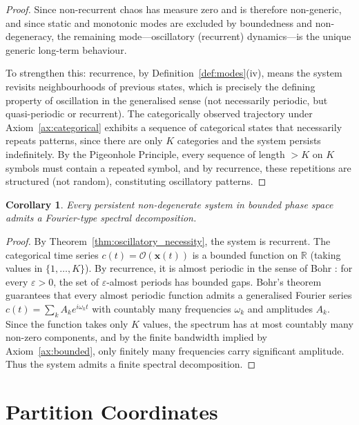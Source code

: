 \documentclass[11pt,twocolumn,a4paper]{article}
\newtheorem{corollary}[theorem]{Corollary}
\newcommand{\R}{\mathbb{R}}
\begin{document}
\begin{proof}
Since non-recurrent chaos has measure zero and is therefore
non-generic, and since static and monotonic modes are excluded by
boundedness and non-degeneracy, the remaining mode---oscillatory
(recurrent) dynamics---is the unique generic long-term behaviour.

To strengthen this: recurrence, by Definition~\ref{def:modes}(iv),
means the system revisits neighbourhoods of previous states, which is
precisely the defining property of oscillation in the generalised sense
(not necessarily periodic, but quasi-periodic or recurrent). The
categorically observed trajectory under Axiom~\ref{ax:categorical}
exhibits a sequence of categorical states that necessarily repeats
patterns, since there are only $K$ categories and the system persists
indefinitely. By the Pigeonhole Principle, every sequence of length
$> K$ on $K$ symbols must contain a repeated symbol, and by recurrence,
these repetitions are structured (not random), constituting oscillatory
patterns.
\end{proof}

\begin{corollary}
\label{cor:spectral_existence}
Every persistent non-degenerate system in bounded phase space admits a
Fourier-type spectral decomposition.
\end{corollary}

\begin{proof}
By Theorem~\ref{thm:oscillatory_necessity}, the system is recurrent.
The categorical time series $c(t) = \mathcal{O}(\mathbf{x}(t))$ is a
bounded function on $\R$ (taking values in $\{1, \ldots, K\}$). By
recurrence, it is almost periodic in the sense of Bohr
\citep{bohr1925}: for every $\varepsilon > 0$, the set of
$\varepsilon$-almost periods has bounded gaps. Bohr's theorem guarantees
that every almost periodic function admits a generalised Fourier series
$c(t) = \sum_k A_k e^{i\omega_k t}$ with countably many frequencies
$\omega_k$ and amplitudes $A_k$. Since the function takes only $K$
values, the spectrum has at most countably many non-zero components, and
by the finite bandwidth implied by Axiom~\ref{ax:bounded}, only
finitely many frequencies carry significant amplitude. Thus the system
admits a finite spectral decomposition.
\end{proof}


\section{Partition Coordinates}
\label{sec:partition_coordinates}
\end{document}

